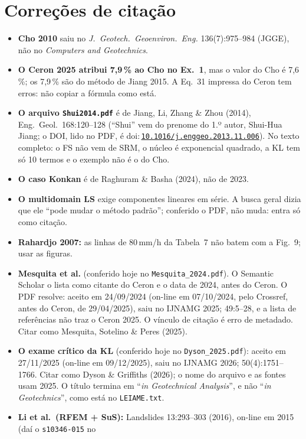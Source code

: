 \documentclass[11pt,a4paper]{article}
\newcommand{\doi}[1]{doi:\,\href{https://doi.org/#1}{\nolinkurl{#1}}}
\begin{document}
\section{Correções de citação}\label{sec:correcoes}
\begin{itemize}
  \item \textbf{Cho 2010} saiu no \emph{J.\ Geotech.\ Geoenviron.\ Eng.} 136(7):975--984 (JGGE), não no
    \emph{Computers and Geotechnics}.
  \item \textbf{O Ceron 2025 atribui 7,9\,\% ao Cho no Ex.~1}, mas o valor do Cho é 7,6\,\%; os 7,9\,\% são do método
    de Jiang 2015. A Eq.~31 impressa do Ceron tem erros: não copiar a fórmula como está.
  \item \textbf{O arquivo \texttt{Shui2014.pdf}} é de Jiang, Li, Zhang \& Zhou (2014), Eng.\ Geol.\ 168:120--128
    (``Shui'' vem do prenome do 1.º autor, Shui-Hua Jiang; o DOI, lido no PDF, é \doi{10.1016/j.enggeo.2013.11.006}). No
    texto completo: o FS não vem de SRM, o núcleo é exponencial quadrado, a KL tem só 10 termos e o exemplo não é o do
    Cho.
  \item \textbf{O caso Konkan} é de Raghuram \& Basha (2024), não de 2023.
  \item \textbf{O multidomain LS} \citep{valdebenito2021} exige componentes lineares em série. A busca geral dizia que
    ele ``pode mudar o método padrão''; conferido o PDF, não muda: entra só como citação.
  \item \textbf{Rahardjo 2007:} as linhas de 80\,mm/h da Tabela~7 não batem com a Fig.~9; usar as figuras.
  \item \textbf{Mesquita et al.} (conferido hoje no \texttt{Mesquita\_2024.pdf}). O Semantic Scholar o lista como
    citante do Ceron e o data de 2024, antes do Ceron. O PDF resolve: aceito em 24/09/2024 (on-line em 07/10/2024,
    pelo Crossref, antes do Ceron, de 29/04/2025), saiu no IJNAMG 2025; 49:5--28, e a lista de referências não traz o
    Ceron 2025. O vínculo de citação é erro de metadado. Citar como Mesquita, Sotelino \& Peres (2025).
  \item \textbf{O exame crítico da KL} (conferido hoje no \texttt{Dyson\_2025.pdf}): aceito em 27/11/2025 (on-line em
    09/12/2025), saiu no IJNAMG 2026; 50(4):1751--1766. Citar como Dyson \& Griffiths (2026); o nome do arquivo e as
    fontes usam 2025. O título termina em ``\emph{in Geotechnical Analysis}'', e não ``\emph{in Geotechnics}'', como
    está no \texttt{LEIAME.txt}.
  \item \textbf{Li et al.\ (RFEM + SuS):} Landslides 13:293--303 (2016), on-line em 2015 (daí o \texttt{s10346-015} no

\end{itemize}
\end{document}
